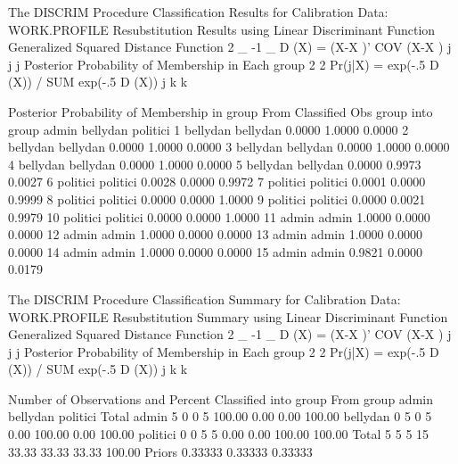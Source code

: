 \documentclass{article}
\begin{document}
\begin{Woutput}
The DISCRIM Procedure
Classification Results for Calibration Data: WORK.PROFILE
Resubstitution Results using Linear Discriminant Function
Generalized Squared Distance Function
 2         _       -1   _
D (X) = (X-X )' COV  (X-X )
 j          j            j
Posterior Probability of Membership in Each group
                   2                    2
Pr(j|X) = exp(-.5 D (X)) / SUM exp(-.5 D (X))
                   j        k           k

          Posterior Probability of Membership in group
       From        Classified
Obs    group       into group       admin    bellydan    politici
  1    bellydan    bellydan        0.0000      1.0000      0.0000
  2    bellydan    bellydan        0.0000      1.0000      0.0000
  3    bellydan    bellydan        0.0000      1.0000      0.0000
  4    bellydan    bellydan        0.0000      1.0000      0.0000
  5    bellydan    bellydan        0.0000      0.9973      0.0027
  6    politici    politici        0.0028      0.0000      0.9972
  7    politici    politici        0.0001      0.0000      0.9999
  8    politici    politici        0.0000      0.0000      1.0000
  9    politici    politici        0.0000      0.0021      0.9979
 10    politici    politici        0.0000      0.0000      1.0000
 11    admin       admin           1.0000      0.0000      0.0000
 12    admin       admin           1.0000      0.0000      0.0000
 13    admin       admin           1.0000      0.0000      0.0000
 14    admin       admin           1.0000      0.0000      0.0000
 15    admin       admin           0.9821      0.0000      0.0179

The DISCRIM Procedure
Classification Summary for Calibration Data: WORK.PROFILE
Resubstitution Summary using Linear Discriminant Function
Generalized Squared Distance Function
 2         _       -1   _
D (X) = (X-X )' COV  (X-X )
 j          j            j
Posterior Probability of Membership in Each group
                   2                    2
Pr(j|X) = exp(-.5 D (X)) / SUM exp(-.5 D (X))
                   j        k           k

   Number of Observations and Percent Classified into group
From
group           admin      bellydan      politici        Total
admin               5             0             0            5
               100.00          0.00          0.00       100.00
bellydan            0             5             0            5
                 0.00        100.00          0.00       100.00
politici            0             0             5            5
                 0.00          0.00        100.00       100.00
Total               5             5             5           15
                33.33         33.33         33.33       100.00
Priors        0.33333       0.33333       0.33333


\end{Woutput}
\end{document}
